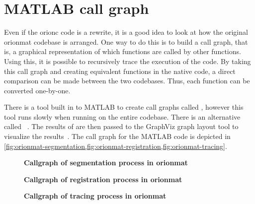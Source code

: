 \section{ MATLAB call graph}\label{appx:matlab-call-graph}

Even if the \gls{orionc} code is a rewrite, it is a good idea to look at how
the original \gls{orionmat} codebase is arranged.  One way to do this is to
build a call graph, that is, a graphical representation of which functions are
called by other functions. Using this, it is possible to recursively trace the
execution of the code. By taking this call graph and creating equivalent
functions in the native code, a direct comparison can be made between the two
codebases. Thus, each function can be converted one-by-one.

There is a tool built in to MATLAB to create call graphs called
, %
however this tool runs slowly when running on the entire codebase.
There is an alternative called ~\autocite{MATLAB:fdep}. The
results of  are then passed to the GraphViz graph layout
tool to visualize the results~\autocite{GraphViz:Gansner:2000}.
The call graph for the MATLAB code is depicted in \cref{fig:orionmat-segmentation,fig:orionmat-registration,fig:orionmat-tracing}.


\begin{figure}
\centering
\resizebox{1.0\textwidth}{!}{}
\caption[Callgraph of segmentation process in ]{
\textbf{\boldmath{} Callgraph of segmentation process in \gls{orionmat}}
}\label{fig:orionmat-segmentation}
\end{figure}

\begin{figure}
\centering
\resizebox{1.0\textwidth}{!}{}
\caption[Callgraph of registration process in ]{
\textbf{\boldmath{} Callgraph of registration process in \gls{orionmat}}
}\label{fig:orionmat-registration}
\end{figure}

\begin{sidewaysfigure}
\centering
\resizebox{1.0\textwidth}{!}{}
\caption[Callgraph of tracing process in ]{
\textbf{\boldmath{}Callgraph of tracing process in \gls{orionmat}}
}\label{fig:orionmat-tracing}
\end{sidewaysfigure}
